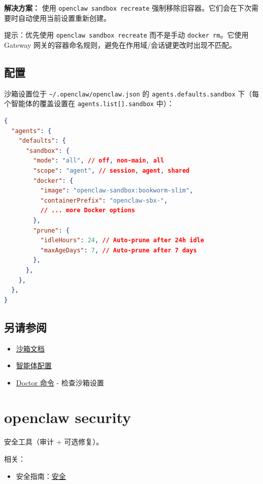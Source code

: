 \textbf{解决方案：} 使用 \texttt{openclaw sandbox recreate} 强制移除旧容器。它们会在下次需要时自动使用当前设置重新创建。

提示：优先使用 \texttt{openclaw sandbox recreate} 而不是手动 \texttt{docker rm}。它使用 Gateway 网关的容器命名规则，避免在作用域/会话键更改时出现不匹配。

\subsection{配置}


沙箱设置位于 \texttt{\textasciitilde{}/.openclaw/openclaw.json} 的 \texttt{agents.defaults.sandbox} 下（每个智能体的覆盖设置在 \texttt{agents.list[].sandbox} 中）：

\begin{lstlisting}[language=json]
{
  "agents": {
    "defaults": {
      "sandbox": {
        "mode": "all", // off, non-main, all
        "scope": "agent", // session, agent, shared
        "docker": {
          "image": "openclaw-sandbox:bookworm-slim",
          "containerPrefix": "openclaw-sbx-",
          // ... more Docker options
        },
        "prune": {
          "idleHours": 24, // Auto-prune after 24h idle
          "maxAgeDays": 7, // Auto-prune after 7 days
        },
      },
    },
  },
}
\end{lstlisting}


\subsection{另请参阅}


\begin{itemize}
  \item \href{/gateway/sandboxing}{沙箱文档}
  \item \href{/concepts/agent-workspace}{智能体配置}
  \item \href{/gateway/doctor}{Doctor 命令} - 检查沙箱设置
\end{itemize}



\clearpage

\section{openclaw security}


安全工具（审计 + 可选修复）。

相关：

\begin{itemize}
  \item 安全指南：\href{/gateway/security}{安全}
\end{itemize}


